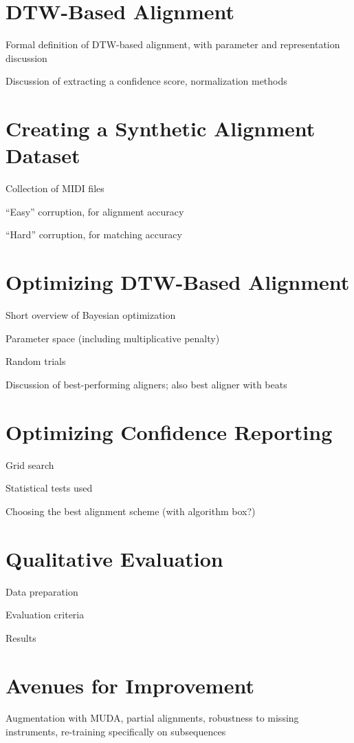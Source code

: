 \documentclass{article}
\begin{document}
\section{DTW-Based Alignment}
\label{sec:dtw}

Formal definition of DTW-based alignment, with parameter and representation discussion

Discussion of extracting a confidence score, normalization methods

\section{Creating a Synthetic Alignment Dataset}
\label{sec:synthetic}

Collection of MIDI files

``Easy'' corruption, for alignment accuracy

``Hard'' corruption, for matching accuracy

\section{Optimizing DTW-Based Alignment}
\label{sec:optimizing}

Short overview of Bayesian optimization

Parameter space (including multiplicative penalty)

Random trials

Discussion of best-performing aligners; also best aligner with beats

\section{Optimizing Confidence Reporting}
\label{sec:confidence}

Grid search

Statistical tests used

Choosing the best alignment scheme (with algorithm box?)

\section{Qualitative Evaluation}
\label{sec:qualitative}

Data preparation

Evaluation criteria

Results

\section{Avenues for Improvement}
\label{sec:avenues}

Augmentation with MUDA, partial alignments, robustness to missing instruments, re-training specifically on subsequences



\end{document}
